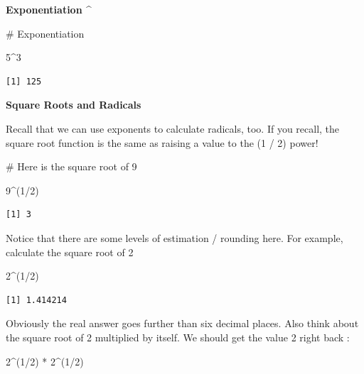 \documentclass[
  letterpaper,
  DIV=11,
  numbers=noendperiod]{scrreprt}
\newenvironment{Shaded}{\begin{snugshade}}{\end{snugshade}}
\newcommand{\CommentTok}[1]{\textcolor[rgb]{0.37,0.37,0.37}{#1}}
\newcommand{\DecValTok}[1]{\textcolor[rgb]{0.68,0.00,0.00}{#1}}
\newcommand{\NormalTok}[1]{\textcolor[rgb]{0.00,0.23,0.31}{#1}}
\newcommand{\SpecialCharTok}[1]{\textcolor[rgb]{0.37,0.37,0.37}{#1}}
\begin{document}
\textbf{Exponentiation \^{}}

\begin{Shaded}
\begin{Highlighting}[]
\CommentTok{\# Exponentiation}

\DecValTok{5}\SpecialCharTok{\^{}}\DecValTok{3}
\end{Highlighting}
\end{Shaded}

\begin{verbatim}
[1] 125
\end{verbatim}

\textbf{Square Roots and Radicals}

Recall that we can use exponents to calculate radicals, too. If you
recall, the square root function is the same as raising a value to the
(1 / 2) power!

\begin{Shaded}
\begin{Highlighting}[]
\CommentTok{\# Here is the square root of 9}

\DecValTok{9}\SpecialCharTok{\^{}}\NormalTok{(}\DecValTok{1}\SpecialCharTok{/}\DecValTok{2}\NormalTok{)}
\end{Highlighting}
\end{Shaded}

\begin{verbatim}
[1] 3
\end{verbatim}

Notice that there are some levels of estimation / rounding here. For
example, calculate the square root of 2

\begin{Shaded}
\begin{Highlighting}[]
\DecValTok{2}\SpecialCharTok{\^{}}\NormalTok{(}\DecValTok{1}\SpecialCharTok{/}\DecValTok{2}\NormalTok{)}
\end{Highlighting}
\end{Shaded}

\begin{verbatim}
[1] 1.414214
\end{verbatim}

Obviously the real answer goes further than six decimal places. Also
think about the square root of 2 multiplied by itself. We should get the
value 2 right back :

\begin{Shaded}
\begin{Highlighting}[]
\DecValTok{2}\SpecialCharTok{\^{}}\NormalTok{(}\DecValTok{1}\SpecialCharTok{/}\DecValTok{2}\NormalTok{) }\SpecialCharTok{*} \DecValTok{2}\SpecialCharTok{\^{}}\NormalTok{(}\DecValTok{1}\SpecialCharTok{/}\DecValTok{2}\NormalTok{)}
\end{Highlighting}
\end{Shaded}
\end{document}
